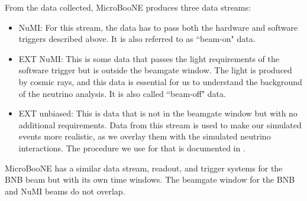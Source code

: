 From the data collected, MicroBooNE produces three data streams:
\begin{itemize}
 \item NuMI: For this stream, the data has to pass both the hardware and software triggers described above. It is also referred to as ``beam-on" data. 
 \item EXT NuMI: This is some data that passes the light requirements of the software trigger but is outside the beamgate window. The light is produced by cosmic rays, and this data is essential for us to understand the background of the neutrino analysis. It is also called ``beam-off" data. 
 \item EXT unbiased: This is data that is not in the beamgate window but with no additional requirements. Data from this stream is used to make our simulated events more realistic, as we overlay them with the simulated neutrino interactions. The procedure we use for that is documented in \cite{afro_phd}. 
\end{itemize}

MicroBooNE has a similar data stream, readout, and trigger systems for the BNB beam but with its own time windows. The beamgate window for the BNB and NuMI beams do not overlap. 